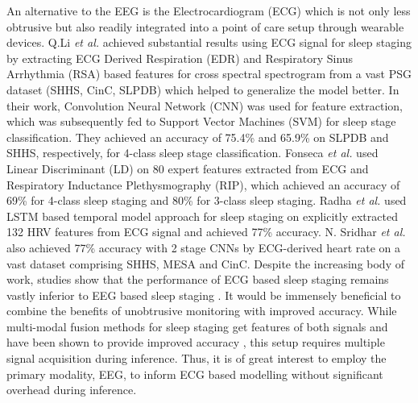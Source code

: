 \documentclass[letterpaper, 10 pt, conference]{ieeeconf}
\begin{document}
An alternative to the EEG is the Electrocardiogram (ECG) which is not only less obtrusive but also readily integrated into a point of care setup through wearable devices. Q.Li \textit{et al.} \cite{li2018deep} achieved substantial results using ECG signal for sleep staging by extracting ECG Derived Respiration (EDR) and Respiratory Sinus Arrhythmia (RSA) based features for cross spectral spectrogram from a vast PSG dataset (SHHS, CinC, SLPDB) which helped to generalize the model better. In their work, Convolution Neural Network (CNN) was used for feature extraction, which was subsequently fed to  Support Vector Machines (SVM) for sleep stage classification. They achieved an accuracy of 75.4\% and 65.9\% on SLPDB and SHHS, respectively, for 4-class sleep stage classification. Fonseca \textit{et al.} \cite{fonseca2015sleep} used Linear Discriminant (LD) on 80 expert features extracted from ECG and Respiratory Inductance Plethysmography (RIP), which achieved an accuracy of 69\% for 4-class sleep staging and 80\% for 3-class sleep staging. Radha \textit{et al.} \cite{radha2019sleep} used LSTM based temporal model approach for sleep staging on explicitly extracted 132 HRV features from ECG signal and achieved 77\% accuracy. N. Sridhar \textit{et al.} \cite{sridhar2020deep} also achieved 77\% accuracy with 2 stage CNNs by ECG-derived heart rate on a vast dataset comprising SHHS, MESA and CinC. Despite the increasing body of work, studies show that the performance of ECG based sleep staging remains vastly inferior to EEG based sleep staging \cite{perslev2019u}\cite{sun2020sleep}. It would be immensely beneficial to combine the benefits of unobtrusive monitoring with improved accuracy. While multi-modal fusion methods for sleep staging get features of both signals and have been shown to provide improved accuracy \cite{fonseca2015sleep}\cite{sun2020sleep}, this setup requires multiple signal acquisition during inference.  Thus, it is of great interest to employ the primary modality, EEG, to inform ECG based modelling without significant overhead during inference.
\end{document}
